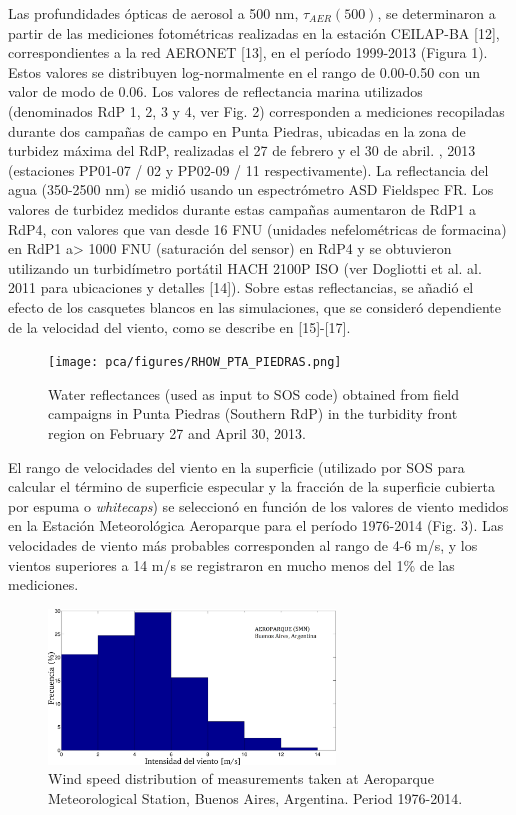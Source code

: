 Las profundidades ópticas de aerosol a 500 nm, $\tau_{AER}(500)$, se determinaron a partir de las mediciones fotométricas realizadas en la estación CEILAP-BA [12], correspondientes a la red AERONET [13], en el período 1999-2013 (Figura 1). Estos valores se distribuyen log-normalmente en el rango de 0.00-0.50 con un valor de modo de 0.06. Los valores de reflectancia marina utilizados (denominados RdP 1, 2, 3 y 4, ver Fig. 2) corresponden a mediciones recopiladas durante dos campañas de campo en Punta Piedras, ubicadas en la zona de turbidez máxima del RdP, realizadas el 27 de febrero y el 30 de abril. , 2013 (estaciones PP01-07 / 02 y PP02-09 / 11 respectivamente). La reflectancia del agua (350-2500 nm) se midió usando un espectrómetro ASD Fieldspec FR. Los valores de turbidez medidos durante estas campañas aumentaron de RdP1 a RdP4, con valores que van desde 16 FNU (unidades nefelométricas de formacina) en RdP1 a> 1000 FNU (saturación del sensor) en RdP4 y se obtuvieron utilizando un turbidímetro portátil HACH 2100P ISO (ver Dogliotti et al. al. 2011 para ubicaciones y detalles [14]). Sobre estas reflectancias, se añadió el efecto de los casquetes blancos en las simulaciones, que se consideró dependiente de la velocidad del viento, como se describe en [15]-[17].

\begin{figure}
\centering
\texttt{[image: pca/figures/RHOW\_PTA\_PIEDRAS.png]}
\caption{Water reflectances (used as input to SOS code) obtained from field campaigns in Punta Piedras (Southern RdP) in the turbidity front region on February 27 and April 30, 2013.}
\label{pca:rhow_pta_piedras}
\end{figure}

El rango de velocidades del viento en la superficie (utilizado por SOS para calcular el término de superficie especular y la fracción de la superficie cubierta por espuma o \textit{whitecaps}) se seleccionó en función de los valores de viento medidos en la Estación Meteorológica Aeroparque para el período 1976-2014 (Fig. 3). Las velocidades de viento más probables corresponden al rango de 4-6 m/s, y los vientos superiores a 14 m/s se registraron en mucho menos del 1\% de las mediciones.

\begin{figure}
\centering
\includegraphics[width=3.0in]{pca/figures/VIENTO_AEROPARQUE.png}
\caption{Wind speed distribution of measurements taken at Aeroparque Meteorological Station, Buenos Aires, Argentina. Period 1976-2014.}
\label{pca:viento_aeroparque}
\end{figure}

